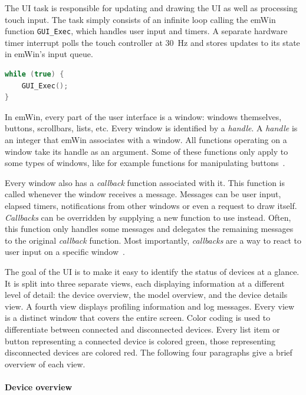 The UI task is responsible for updating and drawing the UI as well as processing touch input. The
task simply consists of an infinite loop calling the emWin function \mbox{\lstinline{GUI_Exec},}
which handles user input and timers. A separate hardware timer interrupt polls the touch controller
at \SI{30}{\hertz} and stores updates to its state in emWin's input queue.

\begin{lstlisting}[language=C++, caption={Main loop of the UI task}]
while (true) {
    GUI_Exec();
}
\end{lstlisting}

In emWin, every part of the user interface is a window: windows themselves, buttons, scrollbars,
lists, etc. Every window is identified by a \textit{handle}. A \textit{handle} is an integer that
emWin associates with a window. All functions operating on a window take its handle as an argument.
Some of these functions only apply to some types of windows, like for example functions for
manipulating buttons~\cite{emwin-manual}.

Every window also has a \textit{callback} function associated with it. This function is called whenever
the window receives a message. Messages can be user input, elapsed timers, notifications from other
windows or even a request to draw itself. \textit{Callbacks} can be overridden by supplying a new
function to use instead. Often, this function only handles some messages and delegates the remaining
messages to the original \textit{callback} function. Most importantly, \textit{callbacks} are a way
to react to user input on a specific window~\cite{emwin-manual}.

The goal of the UI is to make it easy to identify the status of devices at a glance. It is split
into three separate views, each displaying information at a different level of detail: the device
overview, the model overview, and the device details view. A fourth view displays profiling information
and log messages. Every view is a distinct window that covers the entire screen. Color coding is used
to differentiate between connected and disconnected devices. Every list item or button representing
a connected device is colored green, those representing disconnected devices are colored red. The
following four paragraphs give a brief overview of each view.

\clearpage
\paragraph{Device overview}

